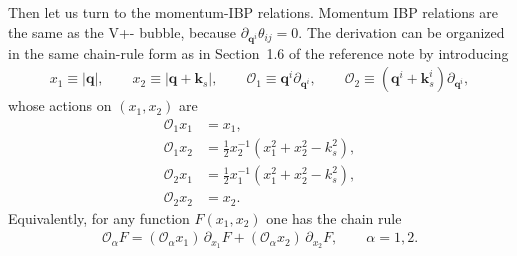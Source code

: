\documentclass[a4paper]{article}
\def\pd{\partial}
\begin{document}
Then let us turn to the momentum-IBP relations. Momentum IBP relations are the same as the V+- bubble, because $\pd_{\bm q^i}\theta_{ij}=0$. The derivation can be organized in the same chain-rule form as in Section~1.6 of the reference note by introducing
\begin{align}
	x_1 \equiv |\bm q|,\qquad x_2 \equiv |\bm q+\bm k_s|,\qquad
	\mathcal{O}_1 \equiv \bm q^i \pd_{\bm q^i},\qquad
	\mathcal{O}_2 \equiv (\bm q^i+\bm k_s^i)\pd_{\bm q^i},
\end{align}
whose actions on $(x_1,x_2)$ are
\begin{align}
	\mathcal{O}_1 x_1 & = x_1, \nonumber\\
	\mathcal{O}_1 x_2 & = \frac{1}{2}x_2^{-1}(x_1^2 + x_2^2 - k_s^2), \nonumber\\
	\mathcal{O}_2 x_1 & = \frac{1}{2}x_1^{-1}(x_1^2 + x_2^2 - k_s^2), \nonumber\\
	\mathcal{O}_2 x_2 & = x_2.
\end{align}
Equivalently, for any function $F(x_1,x_2)$ one has the chain rule
\begin{align}
	\mathcal{O}_\alpha F = (\mathcal{O}_\alpha x_1)\,\partial_{x_1}F + (\mathcal{O}_\alpha x_2)\,\partial_{x_2}F,\qquad \alpha=1,2.
\end{align}
\end{document}
